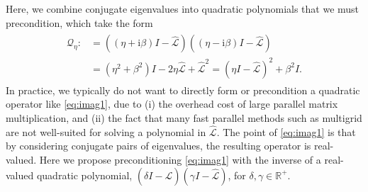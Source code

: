 \documentclass[review]{siamart}
\begin{document}
Here, we combine conjugate eigenvalues into quadratic polynomials
that we must precondition, which take the form 
%
\begin{align}\label{eq:imag1}
\begin{split}
\mathcal{Q}_\eta :&= ((\eta + \mathrm{i}\beta)I -
	\widehat{\mathcal{L}})((\eta - \mathrm{i}\beta)I - \widehat{\mathcal{L}}) \\
& = (\eta^2+\beta^2)I - 2\eta \widehat{\mathcal{L}} + \widehat{\mathcal{L}}^2
= (\eta I - \widehat{\mathcal{L}})^2 + \beta^2I.
\end{split}
\end{align}
%
In practice, we typically do not want to directly form or precondition a quadratic
operator like \eqref{eq:imag1}, due to (i) the overhead cost of large parallel matrix
multiplication, and (ii) the fact that many fast parallel methods such as multigrid are not well-suited for solving a polynomial in $\widehat{\mathcal{L}}$. The point of \eqref{eq:imag1}
is that by considering conjugate pairs of eigenvalues, the resulting operator is real-valued.
Here we propose preconditioning \eqref{eq:imag1} with the inverse of a
real-valued quadratic polynomial, $(\delta I - \widehat{\mathcal{L}})
(\gamma I - \widehat{\mathcal{L}})$, for $\delta,\gamma \in\mathbb{R}^+$.
\end{document}
